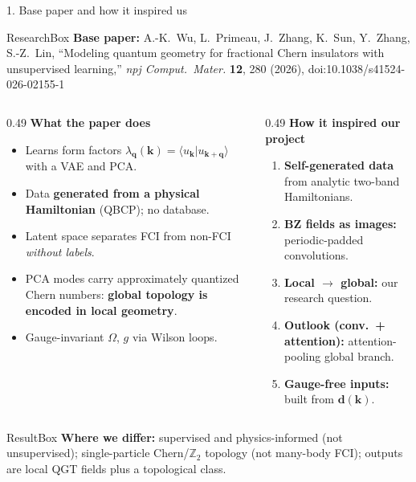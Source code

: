 \documentclass[aspectratio=169,11pt]{beamer}
\newenvironment{ResearchBox}
{\begin{beamercolorbox}[rounded=true,sep=0.45em]{ResearchBox}}
{\end{beamercolorbox}}
\newenvironment{ResultBox}
{\begin{beamercolorbox}[rounded=true,sep=0.40em]{ResultBox}}
{\end{beamercolorbox}}
\begin{document}
\begin{frame}{1. Base paper and how it inspired us}
\footnotesize

\begin{ResearchBox}\scriptsize
\textbf{Base paper:} A.-K.~Wu, L.~Primeau, J.~Zhang, K.~Sun, Y.~Zhang, S.-Z.~Lin,
``Modeling quantum geometry for fractional Chern insulators with unsupervised learning,''
\textit{npj Comput.\ Mater.} \textbf{12}, 280 (2026), doi:10.1038/s41524-026-02155-1
\end{ResearchBox}

\vspace{0.10cm}

\begin{columns}[T]
\begin{column}{0.49\textwidth}
\textbf{What the paper does}
\begin{itemize}
    \item Learns form factors
    $\lambda_{\mathbf q}(\mathbf k)=\langle u_{\mathbf k}|u_{\mathbf k+\mathbf q}\rangle$
    with a VAE and PCA.
    \item Data \textbf{generated from a physical Hamiltonian} (QBCP); no database.
    \item Latent space separates FCI from non-FCI \emph{without labels}.
    \item PCA modes carry approximately quantized Chern numbers:
    \textbf{global topology is encoded in local geometry}.
    \item Gauge-invariant $\Omega$, $g$ via Wilson loops.
\end{itemize}
\end{column}

\begin{column}{0.49\textwidth}
\textbf{How it inspired our project}
\begin{enumerate}
    \item \textbf{Self-generated data} from analytic two-band Hamiltonians.
    \item \textbf{BZ fields as images:} periodic-padded convolutions.
    \item \textbf{Local $\rightarrow$ global:} our research question.
    \item \textbf{Outlook (conv.\ + attention):} attention-pooling global branch.
    \item \textbf{Gauge-free inputs:} built from $\mathbf d(\mathbf k)$.
\end{enumerate}
\end{column}
\end{columns}

\vspace{0.10cm}
\begin{ResultBox}\centering\scriptsize
\textbf{Where we differ:} supervised and physics-informed (not unsupervised);
single-particle Chern/$\mathbb Z_2$ topology (not many-body FCI);
outputs are local QGT fields plus a topological class.
\end{ResultBox}
\end{frame}
\end{document}
